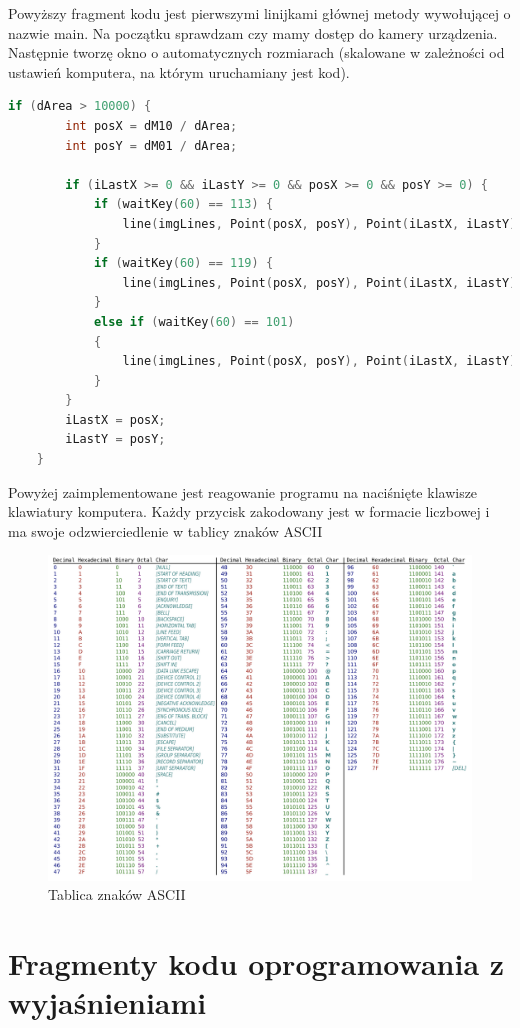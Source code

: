 \documentclass{article}
\begin{document}
Powyższy fragment kodu jest pierwszymi linijkami głównej metody wywołującej o nazwie main. Na początku sprawdzam czy mamy dostęp do kamery urządzenia. Następnie tworzę okno o automatycznych rozmiarach (skalowane w zależności od ustawień komputera, na którym uruchamiany jest kod).

\begin{lstlisting}[language=C++, caption=Klawisze funkcyjne]
	if (dArea > 10000) {
		int posX = dM10 / dArea;
		int posY = dM01 / dArea;        
		
		if (iLastX >= 0 && iLastY >= 0 && posX >= 0 && posY >= 0) {
			if (waitKey(60) == 113) {
				line(imgLines, Point(posX, posY), Point(iLastX, iLastY), Scalar(0,0,255), 15);
			}
			if (waitKey(60) == 119) {
				line(imgLines, Point(posX, posY), Point(iLastX, iLastY), Scalar(0,255,0), 15); 
			}
			else if (waitKey(60) == 101)
			{
				line(imgLines, Point(posX, posY), Point(iLastX, iLastY), Scalar(0,0,0), 15); 
			}
		}
		iLastX = posX;
		iLastY = posY;
	}
\end{lstlisting}

Powyżej zaimplementowane jest reagowanie programu na naciśnięte klawisze klawiatury komputera. Każdy przycisk zakodowany jest w formacie liczbowej i ma swoje odzwierciedlenie w tablicy znaków ASCII
\begin{figure}
	\centering
	\includegraphics[width=15cm]{ascii}
	\caption{Tablica znaków ASCII}
\end{figure}

\newpage

\section*{\textbf{Fragmenty kodu oprogramowania z wyjaśnieniami} }
\end{document}
